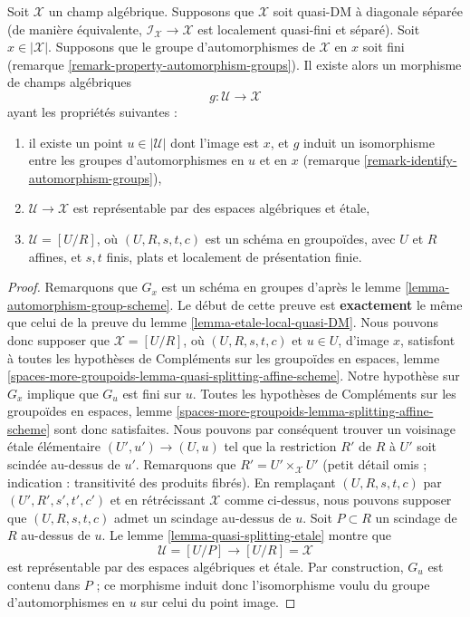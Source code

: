 \begin{lemma}
\label{lemma-etale-local-quasi-DM-at-x}
Soit $\mathcal{X}$ un champ alg\'ebrique. Supposons que $\mathcal{X}$ soit
quasi-DM \`a diagonale s\'epar\'ee (de mani\`ere \'equivalente,
$\mathcal{I}_\mathcal{X} \to \mathcal{X}$ est localement quasi-fini et
s\'epar\'e). Soit $x \in |\mathcal{X}|$. Supposons que le
groupe d'automorphismes de $\mathcal{X}$ en $x$ soit fini
(remarque \ref{remark-property-automorphism-groups}).
Il existe alors un morphisme de champs alg\'ebriques
$$
g : \mathcal{U} \longrightarrow \mathcal{X}
$$
ayant les propri\'et\'es suivantes :
\begin{enumerate}
\item il existe un point $u \in |\mathcal{U}|$ dont l'image est $x$, et
$g$ induit un isomorphisme entre les groupes d'automorphismes en $u$ et en $x$
(remarque \ref{remark-identify-automorphism-groups}),
\item $\mathcal{U} \to \mathcal{X}$ est repr\'esentable par des espaces alg\'ebriques et
\'etale,
\item $\mathcal{U} = [U/R]$, o\`u $(U, R, s, t, c)$ est un sch\'ema
en groupo\"ides, avec $U$ et $R$ affines, et $s, t$ finis, plats et
localement de pr\'esentation finie.
\end{enumerate}
\end{lemma}

\begin{proof}
Remarquons que $G_x$ est un sch\'ema en groupes d'apr\`es
le lemme \ref{lemma-automorphism-group-scheme}.
Le d\'ebut de cette preuve est {\bf exactement} le m\^eme que celui de la preuve
du lemme \ref{lemma-etale-local-quasi-DM}.
Nous pouvons donc supposer que $\mathcal{X} = [U/R]$, o\`u $(U, R, s, t, c)$
et $u \in U$, d'image $x$, satisfont \`a toutes les hypoth\`eses de
Compl\'ements sur les groupo\"ides en espaces, lemme
\ref{spaces-more-groupoids-lemma-quasi-splitting-affine-scheme}.
Notre hypoth\`ese sur $G_x$ implique que $G_u$ est fini sur $u$.
Toutes les hypoth\`eses de
Compl\'ements sur les groupo\"ides en espaces, lemme
\ref{spaces-more-groupoids-lemma-splitting-affine-scheme}
sont donc satisfaites.
Nous pouvons par cons\'equent trouver un voisinage \'etale \'el\'ementaire
$(U', u') \to (U, u)$ tel que la restriction $R'$ de $R$ \`a $U'$
soit scind\'ee au-dessus de $u'$. Remarquons que $R' = U' \times_\mathcal{X} U'$
(petit d\'etail omis ; indication : transitivit\'e des produits fibr\'es).
En rempla\c{c}ant $(U, R, s, t, c)$ par $(U', R', s', t', c')$ et en r\'etr\'ecissant
$\mathcal{X}$ comme ci-dessus, nous pouvons supposer que $(U, R, s, t, c)$ admet
un scindage au-dessus de $u$. Soit $P \subset R$ un scindage de $R$ au-dessus de $u$.
Le lemme \ref{lemma-quasi-splitting-etale} montre que
$$
\mathcal{U} = [U/P] \longrightarrow [U/R] = \mathcal{X}
$$
est repr\'esentable par des espaces alg\'ebriques et \'etale. Par construction,
$G_u$ est contenu dans $P$ ; ce morphisme induit donc l'isomorphisme voulu
du groupe d'automorphismes en $u$ sur celui du point image.
\end{proof}


